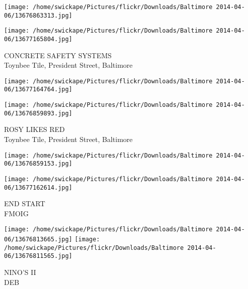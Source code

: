 \documentclass[10pt,letterpaper]{article}
\begin{document}
\texttt{[image: /home/swickape/Pictures/flickr/Downloads/Baltimore 2014-04-06/13676863313.jpg]}

\vspace{0.25in}
\texttt{[image: /home/swickape/Pictures/flickr/Downloads/Baltimore 2014-04-06/13677165804.jpg]}

CONCRETE SAFETY SYSTEMS\\
Toynbee Tile, President Street, Baltimore\\
\pagebreak

\texttt{[image: /home/swickape/Pictures/flickr/Downloads/Baltimore 2014-04-06/13677164764.jpg]}

\vspace{0.25in}
\texttt{[image: /home/swickape/Pictures/flickr/Downloads/Baltimore 2014-04-06/13676859893.jpg]}

ROSY LIKES RED\\
Toynbee Tile, President Street, Baltimore\\
\pagebreak

\texttt{[image: /home/swickape/Pictures/flickr/Downloads/Baltimore 2014-04-06/13676859153.jpg]}

\vspace{0.25in}
\texttt{[image: /home/swickape/Pictures/flickr/Downloads/Baltimore 2014-04-06/13677162614.jpg]}

END START\\
FMOIG\\
\pagebreak

\texttt{[image: /home/swickape/Pictures/flickr/Downloads/Baltimore 2014-04-06/13676813665.jpg]}
\texttt{[image: /home/swickape/Pictures/flickr/Downloads/Baltimore 2014-04-06/13676811565.jpg]}

NINO'S II\\
DEB\\
\pagebreak
\end{document}
